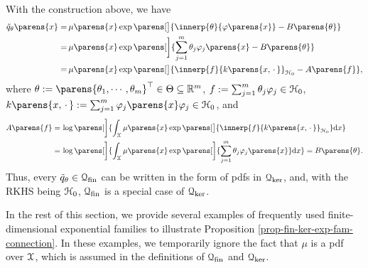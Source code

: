 With the construction above, we have 
\begin{align*}
	\tilde{q}_{\theta} \parens{x} = & \, \mu \parens{x} \exp \parens[\big]{\innerp{\theta}{\varphi \parens{x}} - B \parens{\theta}}  \\ 
	= & \, \mu \parens{x} \exp \parens[\bigg]{\sum_{j=1}^m \theta_j \varphi_j \parens{x} - B \parens{\theta}} \\ 
	= & \, \mu \parens{x} \exp \parens[\big]{\innerp{f}{k \parens{x, \,\cdot\,}}_{\calH_0} - A \parens{f}}, 
\end{align*}
where $\theta := \parens{\theta_1, \cdots, \theta_m}^\top \in \Theta \subseteq \Real^m$, $f := \sum_{j=1}^m \theta_j \varphi_j \in \mathcal{H}_0$, $k \parens{x, \,\cdot\,} := \sum_{j=1}^m \varphi_j \parens{x} \varphi_j \in \calH_0$, and 
\begin{align*}
	A \parens{f} = & \, \log \parens[\bigg]{\int_{\calX} \mu \parens{x} \exp \parens[\big]{\innerp{f}{k \parens{x, \,\cdot\,}}_{\calH_0} } \diff x} \\ 
	= & \, \log \parens[\bigg]{\int_{\calX} \mu \parens{x} \exp \parens[\bigg]{ \sum_{j=1}^m \theta_j \varphi_j \parens{x} } \diff x} = B \parens{\theta}. 
\end{align*}
Thus, every $\tilde{q}_{\theta} \in \mathcal{Q}_{\mathrm{fin}}$ can be written in the form of pdfs in $\mathcal{Q}_{\ker}$, and, with the RKHS being $\mathcal{H}_0$, $\mathcal{Q}_{\mathrm{fin}}$ is a special case of $\mathcal{Q}_{\ker}$. 

In the rest of this section, we provide several examples of frequently used finite-dimensional exponential families to illustrate Proposition \ref{prop-fin-ker-exp-fam-connection}. In these examples, we temporarily ignore the fact that $\mu$ is a pdf over $\mathcal{X}$, which is assumed in the definitions of $\mathcal{Q}_{\mathrm{fin}}$ and $\mathcal{Q}_{\ker}$. 


